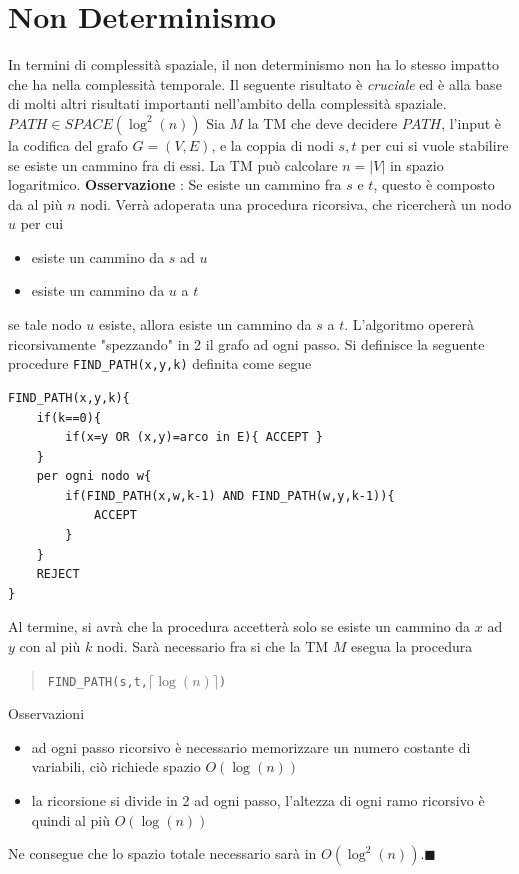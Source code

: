 \documentclass[10pt, letterpaper]{report}
\begin{document}
\section{Non Determinismo}\label{ndetSpace}
In termini di complessità spaziale, il non determinismo non ha lo stesso impatto che ha nella complessità temporale. Il seguente risultato è \textit{cruciale} ed è alla base di molti altri risultati importanti nell'ambito della complessità spaziale.\acc 
\teo{} $PATH \in SPACE(\log^2(n))$\acc 
\dimo{} Sia $M$ la TM che deve decidere $PATH$, l'input è la codifica del grafo $G=(V,E)$, e la coppia di nodi $s,t$ per cui si vuole stabilire se esiste un cammino fra di essi. La TM può calcolare $n=|V|$ in spazio logaritmico. \acc 
\textbf{Osservazione} : Se esiste un cammino fra $s$ e $t$, questo è composto da al più $n$ nodi.\acc 
Verrà adoperata una procedura ricorsiva, che ricercherà un nodo $u$ per cui \begin{itemize}
    \item esiste un cammino da $s$ ad $u$ 
    \item esiste un cammino da $u$ a $t$
\end{itemize}
se tale nodo $u$ esiste, allora esiste un cammino da $s$ a $t$. L'algoritmo opererà ricorsivamente "spezzando" in 2 il grafo ad ogni passo. \acc 
Si definisce la seguente procedure \texttt{FIND\_PATH(x,y,k)} definita come segue 
\begin{lstlisting}
FIND_PATH(x,y,k){
    if(k==0){
        if(x=y OR (x,y)=arco in E){ ACCEPT }
    }
    per ogni nodo w{
        if(FIND_PATH(x,w,k-1) AND FIND_PATH(w,y,k-1)){
            ACCEPT
        }
    }
    REJECT 
}
\end{lstlisting}
Al termine, si avrà che la procedura accetterà solo se esiste un cammino da $x$ ad $y$ con al più $k$ nodi. Sarà necessario fra si che la TM $M$ esegua la procedura \begin{quote}
    \texttt{FIND\_PATH(s,t,$\lceil \log(n)\rceil $)}
\end{quote}
Osservazioni\begin{itemize}
    \item ad ogni passo ricorsivo è necessario memorizzare un numero costante di variabili, ciò richiede spazio $O(\log(n))$
    \item la ricorsione si divide in 2 ad ogni passo, l'altezza di ogni ramo ricorsivo è quindi al più $O(\log(n))$
\end{itemize}
Ne consegue che lo spazio totale necessario sarà in $O(\log^2(n))$.\hfill$\blacksquare$\acc  
\end{document}

